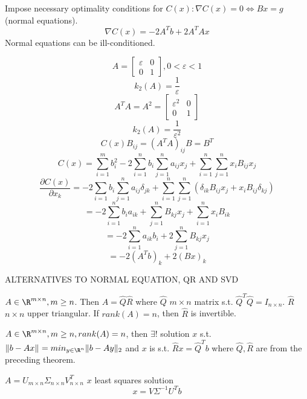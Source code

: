 Impose necessary optimality conditions for $C(x): \nabla C(x)=0 \Leftrightarrow Bx=g$ (normal equations).
  $$\nabla C(x)=-2A^Tb+2A^TAx$$
  Normal equations can be ill-conditioned.
  \begin{example}
    $$A=
    \begin{bmatrix}
        \varepsilon & 0 \\
        0 & 1
    \end{bmatrix}, 0 <\varepsilon <1$$
    $$k_2(A)=\frac{1}{\varepsilon}$$
    $$A^TA=A^2=
    \begin{bmatrix}
        \varepsilon^2 & 0 \\
        0 & 1
    \end{bmatrix}$$
    $$k_2(A)=\frac{1}{\varepsilon^2}$$
    $$C(x) B_{ij}=\left(A^TA\right)_{ij} B=B^T$$
    $$C(x)=\sum_{i=1}^m b_i^2-2\sum_{i=1}^n b_i\sum_{j=1}^n a_{ij}x_j+\sum_{i=1}^n\sum_{j=1}^n x_iB_{ij}x_j$$
    $$\frac{\partial C(x)}{\partial x_k}=-2\sum_{i=1}b_i\sum_{j=1}^na_{ij}\delta_{jk}+\sum_{i=1}^n\sum_{j=1}^n \left(\delta_{ik}B_{ij}x_j+x_iB_{ij}\delta_{kj}\right)$$
    $$=-2\sum_{i=1}^nb_ia_{ik}+\sum_{j=1}^nB_{kj}x_j+\sum_{i=1}^nx_iB_{ik}$$
    $$=-2\sum_{i=1}^n a_{ik}b_i + 2\sum_{j=1}^nB_{kj}x_j$$
    $$=-2(A^Tb)_k+2(Bx)_k$$
  \end{example}
ALTERNATIVES TO NORMAL EQUATION, QR AND SVD
\begin{theorem}
  $A\in\R^{m\times n}, m\geq n$. Then $A=\hat{Q}\hat{R}$ where $\hat{Q}$ $m\times n$ matrix s.t. $\hat{Q}^T\hat{Q}=I_{n\times n}$.
  \newline $\hat{R}$ $n\times n$ upper triangular.
  \newline If $rank(A)=n$, then $\hat{R}$ is invertible.
\end{theorem}
\begin{theorem}
  $A\in \R^{m\times n}, m\geq n, rank(A)=n$, then
  $\exists !$ solution $x$ s.t. $\| b-Ax \|_{} =min_{y\in \R^n}\| b-Ay \|_{2} $ and $x$ is s.t. $\hat{R}x=\hat{Q}^Tb$ where $\hat{Q},\hat{R}$ are from the preceding theorem.
\end{theorem}
$A=U_{m \times n}\Sigma_{n\times n} V^T_{n\times n}$ $x$ least squares solution
  $$x=V\Sigma^{-1}U^Tb$$
